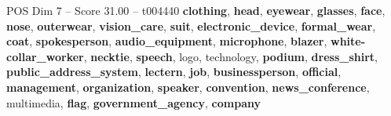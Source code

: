 \begin{textsample}{POS Dim 7 – Score 31.00 – t004440}  \label{ex:f7_pos_002}
\textbf{clothing}, \textbf{head}, \textbf{eyewear}, \textbf{glasses}, \textbf{face}, \textbf{nose}, \textbf{outerwear}, \textbf{vision\_care}, \textbf{suit}, \textbf{electronic\_device}, \textbf{formal\_wear}, \textbf{coat}, \textbf{spokesperson}, \textbf{audio\_equipment}, \textbf{microphone}, \textbf{blazer}, \textbf{white-collar\_worker}, \textbf{necktie}, \textbf{speech}, logo, technology, \textbf{podium}, \textbf{dress\_shirt}, \textbf{public\_address\_system}, \textbf{lectern}, \textbf{job}, \textbf{businessperson}, \textbf{official}, \textbf{management}, \textbf{organization}, \textbf{speaker}, \textbf{convention}, \textbf{news\_conference}, multimedia, \textbf{flag}, \textbf{government\_agency}, \textbf{company}

\end{textsample}
